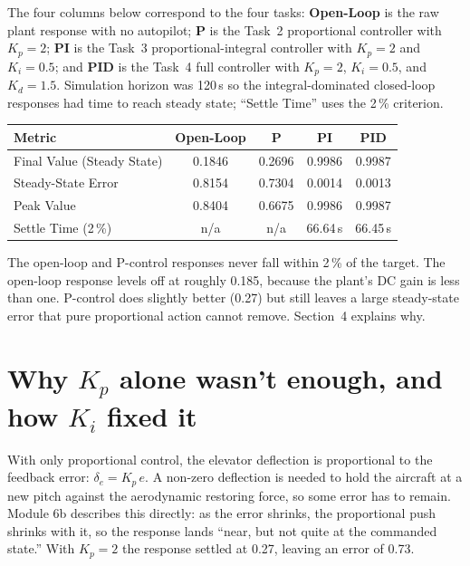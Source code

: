 \documentclass[11pt,letterpaper]{article}
\begin{document}
The four columns below correspond to the four tasks: \textbf{Open-Loop} is
the raw plant response with no autopilot; \textbf{P} is the Task~2
proportional controller with $K_{p}=2$; \textbf{PI} is the Task~3
proportional-integral controller with $K_{p}=2$ and $K_{i}=0.5$; and
\textbf{PID} is the Task~4 full controller with $K_{p}=2$, $K_{i}=0.5$, and
$K_{d}=1.5$. Simulation horizon was 120\,s so the integral-dominated
closed-loop responses had time to reach steady state; ``Settle Time'' uses
the 2\,\% criterion.

\begin{table}[h!]
\centering
\small
\begin{tabular}{@{}lcccc@{}}
\toprule
\textbf{Metric} & \textbf{Open-Loop} & \textbf{P} & \textbf{PI} & \textbf{PID} \\
\midrule
Final Value (Steady State) & 0.1846 & 0.2696 & 0.9986 & 0.9987 \\
Steady-State Error         & 0.8154 & 0.7304 & 0.0014 & 0.0013 \\
Peak Value                 & 0.8404 & 0.6675 & 0.9986 & 0.9987 \\
Settle Time (2\,\%)        & n/a    & n/a    & 66.64\,s & 66.45\,s \\
\bottomrule
\end{tabular}
\end{table}

The open-loop and P-control responses never fall within 2\,\% of the
target. The open-loop response levels off at roughly 0.185, because the
plant's DC gain is less than one. P-control does slightly better (0.27)
but still leaves a large steady-state error that pure proportional action
cannot remove. Section~4 explains why.

\section{Why $K_{p}$ alone wasn't enough, and how $K_{i}$ fixed it}

With only proportional control, the elevator deflection is proportional to
the feedback error: $\delta_{e} = K_{p}\,e$. A non-zero deflection is needed
to hold the aircraft at a new pitch against the aerodynamic restoring force,
so some error has to remain. Module 6b describes this directly: as the
error shrinks, the proportional push shrinks with it, so the response lands
``near, but not quite at the commanded state.'' With $K_{p}=2$ the response
settled at 0.27, leaving an error of 0.73.
\end{document}
